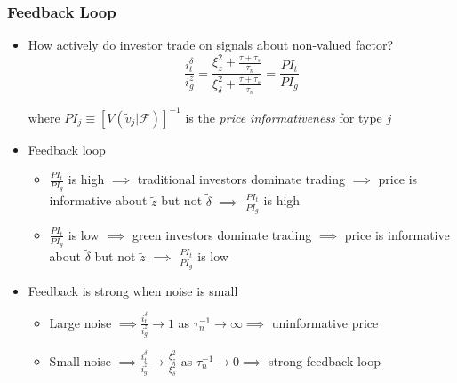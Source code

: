 \documentclass[handout]{beamer}
\begin{document}
\begin{frame}
\frametitle{Feedback Loop}
\begin{itemize}[<+->]
\item How actively do investor trade on signals about non-valued factor?
$$
\frac{i_t^\delta}{i_g^z} = \frac{\xi_z^2 + \frac{\tau + \tau_s}{\tau_n}}{\xi_\delta^2 + \frac{\tau + \tau_s}{\tau_n}} = \frac{PI_t}{PI_g}
$$

where $PI_j \equiv [V(\tilde v_j | \mathcal{F})]^{-1}$ is the \textit{price informativeness} for type $j$

\bigskip

\item Feedback loop

\begin{itemize}[<+->]

\item $\frac{PI_t}{PI_g}$ is high $\implies$ traditional investors dominate trading $\implies$ price is informative about $\tilde z$ but not $\tilde \delta$ $\implies$ $\frac{PI_t}{PI_g}$ is high
\item $\frac{PI_t}{PI_g}$ is low $\implies$ green investors dominate trading $\implies$ price is informative about $\tilde \delta$ but not $\tilde z$ $\implies$ $\frac{PI_t}{PI_g}$ is low

\end{itemize}

\bigskip

\item Feedback is strong when noise is small

\begin{itemize}[<+->]

\item Large noise $\implies \frac{i_t^\delta}{i_g^z}\to 1$ as $\tau_n^{-1} \to \infty \implies$ uninformative price 

\item Small noise $\implies \frac{i_t^\delta}{i_g^z}\to \frac{\xi_z^2}{\xi_\delta^2}$ as $\tau_n^{-1} \to 0 \implies$ strong feedback loop

\end{itemize}

\end{itemize}
\end{frame}
\end{document}
